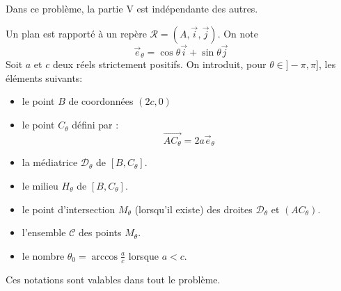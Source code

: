 Dans ce problème, la partie V est indépendante des autres.

Un plan est rapporté à un repère $\mathcal R = (A,\overrightarrow{i},\overrightarrow{j})$. On note
\begin{displaymath}
 \overrightarrow{e}_\theta = \cos \theta \overrightarrow{i}+ \sin \theta \overrightarrow{j}
\end{displaymath}
Soit $a$ et $c$ deux réels strictement positifs. On introduit, pour $\theta \in ]-\pi,\pi]$,  les éléments suivants:
\begin{itemize}
 \item le point $B$ de coordonnées $(2c,0)$
\item le point $C_\theta$  défini par :
\begin{displaymath}
 \overrightarrow{AC_\theta} = 2a \overrightarrow{e}_\theta 
\end{displaymath}
\item la médiatrice $\mathcal{D}_\theta$  de $[B,C_\theta]$.
\item le milieu $H_\theta$ de $[B,C_\theta]$.
\item le point d'intersection $M_\theta$ (lorsqu'il existe) des droites $\mathcal{D}_\theta$ et $(AC_\theta)$.
\item l'ensemble $\mathcal C$ des points $M_\theta$.
\item le nombre $\theta_0 = \arccos \frac{a}{c}$ lorsque $a<c$.
\end{itemize}
Ces notations sont valables dans tout le problème.
